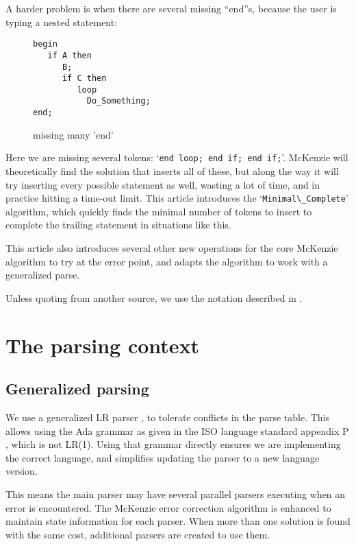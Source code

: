 \documentclass{article}
\newcommand{\code}[1]{`\lstinline|#1|'}
\begin{document}
A harder problem is when there are several missing ``end''s, because
the user is typing a nested statement:
\begin{figure}[H]
\begin{lstlisting}
begin
   if A then
      B;
      if C then
         loop
           Do_Something;
end;
\end{lstlisting}
\caption{missing many 'end'}
\label{ex:min_com_if_if_loop}
\end{figure}

Here we are missing several tokens: \code{end loop; end if; end if;}.
McKenzie will theoretically find the solution that inserts all of
these, but along the way it will try inserting every possible
statement as well, wasting a lot of time, and in practice hitting a
time-out limit. This article introduces the \code{Minimal\_Complete}
algorithm, which quickly finds the minimal number of tokens to insert
to complete the trailing statement in situations like this.

This article also introduces several other new operations for the core
McKenzie algorithm to try at the error point, and adapts the algorithm
to work with a generalized parse.

Unless quoting from another source, we use the notation described in
\cite{DeRemer 1982}.


\section{The parsing context}
\subsection{Generalized parsing}
We use a generalized LR parser \cite{Tomita 1986}, to tolerate
conflicts in the parse table. This allows using the Ada grammar as
given in the ISO language standard appendix P \cite{Ada 2012}, which
is not LR(1). Using that grammar directly ensures we are implementing
the correct language, and simplifies updating the parser to a new
language version.

This means the main parser may have several parallel parsers executing
when an error is encountered. The McKenzie error correction algorithm
is enhanced to maintain state information for each parser. When more
than one solution is found with the same cost, additional parsers are
created to use them.
\end{document}
